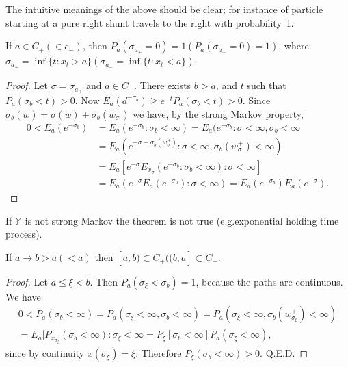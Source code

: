 The intuitive meanings of the above should be clear; for instance of
particle starting at a pure right shunt travels to the right with
probability~1.

\setcounter{thm}{0} 
\begin{thm}\label{chap6-sec1-thm1}%
If $a \in C_+ (\in c_-)$, then $P_a(\sigma_{a_+}=0)=1 (P_a
  (\sigma_{a_-} = 0) = 1)$, where $\sigma_{a_+} = \inf \{t : x_t > a
  \} (\sigma_{a_-} = \inf \{t : x_t < a \})$. 
\end{thm}

\begin{proof}
Let $\sigma= \sigma_{a_+}$ and $a \in C_+$. There exists $b>a$, and
  $t$ such that $P_a (\sigma_b < t) > 0$. Now $E_a (d^{- \sigma_b})
  \geq e^{-t} P_a (\sigma_b < t) > 0$. Since $\sigma_b(w) = \sigma(w)
  + \sigma_b (w^+_\sigma)$ we have, by the strong Markov property, 
  \begin{align*}
    0 < E_a (e^{- \sigma_b}) &= E_a (e^{- \sigma_b}: \sigma_b < \infty )
    = E_a (e^{- \sigma_b}: \sigma < \infty , \sigma_b < \infty \\ 
    &= E_a (e^{- \sigma - \sigma_b (w^+_\sigma)}: \sigma < \infty ,
    \sigma_b (w^+_\sigma ) < \infty )\\ 
    & =  E_a [e^{- \sigma}
      E_{x_\sigma} (e^{- \sigma_b}: \sigma_b < \infty ): \sigma <
      \infty ] \\ 
    &= E_a (e^{-\sigma} E_a (e^{- \sigma_b}): \sigma < \infty ) = E_a (e^{-
      \sigma_b}) E_a(e^{-\sigma}). \tag*{Q.E.D} 
  \end{align*}
\end{proof}

\begin{remark*}
  If $\mathbb{M}$ is not strong Markov the theorem is not true
  (e.g.\pageoriginale exponential holding time process). 
\end{remark*}

\begin{thm}\label{chap6-sec1-thm2}%
If $a \rightarrow b > a (< a)$ then $[a, b)  \subset C_+ ((b, a] \subset C_-$.
\end{thm}

\begin{proof}
Let $a \leq \xi < b$. Then $P_a(\sigma_\xi < \sigma_b) =1$, because
the paths are continuous. We have 
\begin{gather*}
    0 < P_a (\sigma_b < \infty ) = P_a (\sigma_\xi < \infty ,\sigma_b
    < \infty) = P_a(\sigma_\xi < \infty , \sigma_b (w^+_{\sigma_\xi})
    < \infty) \\ 
    = E_a [P_{x_{\sigma_\xi}}	(\sigma_b < \infty ): \sigma_\xi <
      \infty = P_\xi [\sigma_b < \infty ] P_a (\sigma_\xi < \infty ), 
  \end{gather*}
 since by continuity $x (\sigma_\xi) = \xi$. Therefore $P_\xi
 (\sigma_b < \infty ) > 0$. 
Q.E.D.
\end{proof}


